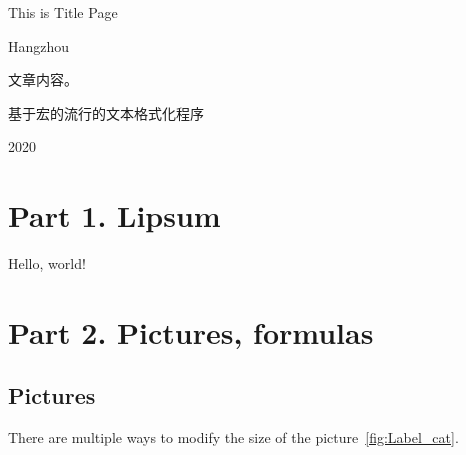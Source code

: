 \documentclass[a4paper]{article}
\begin{document}
\begin{center}

{\Huge 
This is Title Page
}
\vspace{10cm} %

\LARGE Hangzhou

\begin{CJK*}{UTF8}{gbsn} %
文章内容。

基于宏的流行的文本格式化程序
\end{CJK*}

2020
\rm %
\end{center}

\newpage %
\setcounter{page}{2} %

\section{Part 1. Lipsum}

Hello, world!

\lipsum[7] %
\medskip %
\lipsum[10] %
\bigskip %
\lipsum[7-10] %


\newpage
\section{Part 2. Pictures, formulas}
\subsection{Pictures}

There are multiple ways to modify the size of the picture~\ref{fig:Label_cat}.
\end{document}
